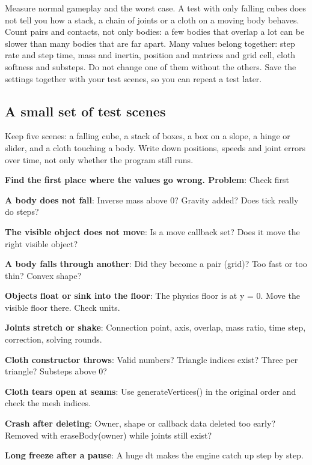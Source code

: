 \documentclass[11pt,a4paper]{article}
\begin{document}
Measure normal gameplay and the worst case. A test with only falling cubes does not tell you how a stack, a chain of joints or a cloth on a moving body behaves. Count pairs and contacts, not only bodies: a few bodies that overlap a lot can be slower than many bodies that are far apart. Many values belong together: step rate and step time, mass and inertia, position and matrices and grid cell, cloth softness and substeps. Do not change one of them without the others. Save the settings together with your test scenes, so you can repeat a test later.

\subsection*{A small set of test scenes}
Keep five scenes: a falling cube, a stack of boxes, a box on a slope, a hinge or slider, and a cloth touching a body. Write down positions, speeds and joint errors over time, not only whether the program still runs.

\label{vpe-core-29}
\textbf{Find the first place where the values go wrong. Problem}: Check first

\textbf{A body does not fall}: Inverse mass above 0? Gravity added? Does tick really do steps?

\textbf{The visible object does not move}: Is a move callback set? Does it move the right visible object?

\textbf{A body falls through another}: Did they become a pair (grid)? Too fast or too thin? Convex shape?

\textbf{Objects float or sink into the floor}: The physics floor is at y = 0. Move the visible floor there. Check units.

\textbf{Joints stretch or shake}: Connection point, axis, overlap, mass ratio, time step, correction, solving rounds.

\textbf{Cloth constructor throws}: Valid numbers? Triangle indices exist? Three per triangle? Substeps above 0?

\textbf{Cloth tears open at seams}: Use generateVertices() in the original order and check the mesh indices.

\textbf{Crash after deleting}: Owner, shape or callback data deleted too early? Removed with eraseBody(owner) while joints still exist?

\textbf{Long freeze after a pause}: A huge dt makes the engine catch up step by step.
\end{document}
